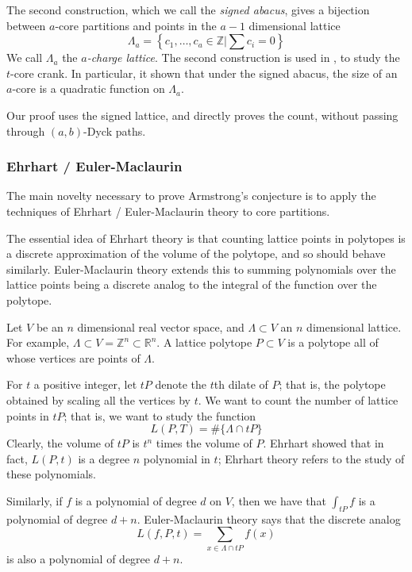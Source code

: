 \documentclass{amsart}[12pt]
\theoremstyle{definition}
\newcommand{\Z}{\mathbb{Z}}
\newcommand{\R}{\mathbb{R}}
\begin{document}
The second construction, which we call the \emph{signed abacus}, gives a bijection between $a$-core partitions and points in the $a-1$ dimensional lattice 
$$\Lambda_a=\left\{c_1,\dots,c_a\in\Z\Big |\sum c_i=0\right\}$$
We call $\Lambda_a$ the \emph{$a$-charge lattice}.  The second construction is used in \cite{GKS}, to study the $t$-core crank.  In particular, it shown that under the signed abacus, the size of an $a$-core is a quadratic function on $\Lambda_a$.  

Our proof uses the signed lattice, and directly proves the count, without passing through $(a,b)$-Dyck paths.

\subsubsection{Ehrhart / Euler-Maclaurin}
The main novelty necessary to prove Armstrong's conjecture is to apply the techniques of Ehrhart / Euler-Maclaurin theory to core partitions.

 The essential idea of Ehrhart theory is that counting lattice points in polytopes is a discrete approximation of the volume of the polytope, and so should behave similarly.  Euler-Maclaurin theory extends this to summing polynomials over the lattice points being a discrete analog to the integral of the function over the polytope.


Let $V$ be an $n$ dimensional real vector space, and $\Lambda\subset V$ an $n$ dimensional lattice.  For example, $\Lambda\subset V=\Z^n\subset \R^n$.  A lattice polytope $P\subset V$ is a polytope all of whose vertices are points of $\Lambda$.  

For $t$ a positive integer, let $tP$ denote the $t$th dilate of $P$; that is, the polytope obtained by scaling all the vertices by $t$.  We want to count the number of lattice points in $tP$; that is, we want to study the function
$$L(P,T)=\#\{\Lambda\cap tP\}$$
Clearly, the volume of $tP$ is $t^n$ times the volume of $P$.  Ehrhart showed that in fact, $L(P,t)$ is a degree $n$ polynomial in $t$; Ehrhart theory refers to the study of these polynomials.

Similarly, if $f$ is a polynomial of degree $d$ on $V$, then we have that $\int_{tP} f$ is a polynomial of degree $d+n$.  Euler-Maclaurin theory says that the discrete analog
 $$L(f, P, t)=\sum_{x\in\Lambda\cap tP} f(x)$$
is also a polynomial of degree $d+ n$.
\end{document}
